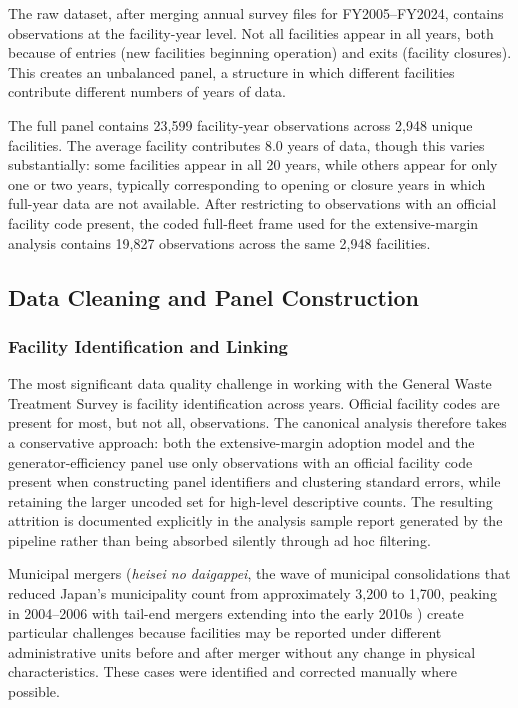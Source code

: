 \documentclass[12pt,a4paper]{article}
\begin{document}
The raw dataset, after merging annual survey files for FY2005--FY2024, contains observations at the facility-year level. Not all facilities appear in all years, both because of entries (new facilities beginning operation) and exits (facility closures). This creates an unbalanced panel, a structure in which different facilities contribute different numbers of years of data.

The full panel contains 23,599 facility-year observations across 2,948 unique facilities. The average facility contributes 8.0 years of data, though this varies substantially: some facilities appear in all 20 years, while others appear for only one or two years, typically corresponding to opening or closure years in which full-year data are not available. After restricting to observations with an official facility code present, the coded full-fleet frame used for the extensive-margin analysis contains 19,827 observations across the same 2,948 facilities.

\subsection{Data Cleaning and Panel Construction}

\subsubsection{Facility Identification and Linking}

The most significant data quality challenge in working with the General Waste Treatment Survey is facility identification across years. Official facility codes are present for most, but not all, observations. The canonical analysis therefore takes a conservative approach: both the extensive-margin adoption model and the generator-efficiency panel use only observations with an official facility code present when constructing panel identifiers and clustering standard errors, while retaining the larger uncoded set for high-level descriptive counts. The resulting attrition is documented explicitly in the analysis sample report generated by the pipeline rather than being absorbed silently through ad hoc filtering.

Municipal mergers (\emph{heisei no daigappei}, the wave of municipal consolidations that reduced Japan's municipality count from approximately 3,200 to 1,700, peaking in 2004--2006 with tail-end mergers extending into the early 2010s \citep{Rausch2006}) create particular challenges because facilities may be reported under different administrative units before and after merger without any change in physical characteristics. These cases were identified and corrected manually where possible.
\end{document}
